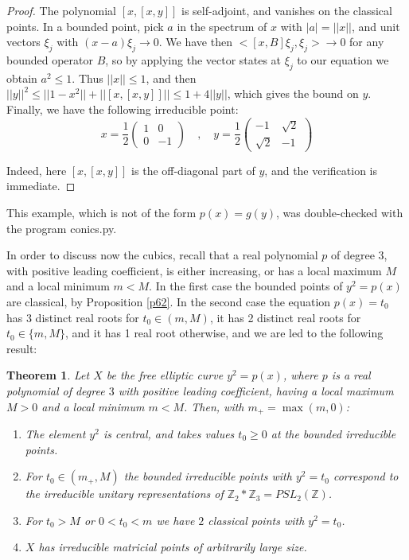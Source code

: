 \documentclass[11pt]{amsart}
\newtheorem{theorem}{Theorem}[section]
\theoremstyle{definition}
\begin{document}
\begin{proof}
The polynomial $[x,[x,y]]$ is self-adjoint, and vanishes on the classical points. In a bounded point, pick $a$ in the spectrum of $x$ with $|a|=||x||$, and unit vectors $\xi_j$ with $(x-a)\xi_j\to0$. We have then $<[x,B]\xi_j,\xi_j>\to0$ for any bounded operator $B$, so by applying the vector states at $\xi_j$ to our equation we obtain $a^2\leq1$. Thus $||x||\leq1$, and then $||y||^2\leq||1-x^2||+||[x,[x,y]]||\leq1+4||y||$, which gives the bound on $y$. Finally, we have the following irreducible point:
$$x=\frac{1}{2}\begin{pmatrix}1&0\\0&-1\end{pmatrix}\quad,\quad y=\frac{1}{2}\begin{pmatrix}-1&\sqrt2\\ \sqrt2&-1\end{pmatrix}$$

Indeed, here $[x,[x,y]]$ is the off-diagonal part of $y$, and the verification is immediate.
\end{proof}

This example, which is not of the form $p(x)=g(y)$, was double-checked with the program conics.py.

In order to discuss now the cubics, recall that a real polynomial $p$ of degree 3, with positive leading coefficient, is either increasing, or has a local maximum $M$ and a local minimum $m<M$. In the first case the bounded points of $y^2=p(x)$ are classical, by Proposition \ref{p62}. In the second case the equation $p(x)=t_0$ has 3 distinct real roots for $t_0\in(m,M)$, it has 2 distinct real roots for $t_0\in\{m,M\}$, and it has 1 real root otherwise, and we are led to the following result:

\begin{theorem}\label{t63}
Let $X$ be the free elliptic curve $y^2=p(x)$, where $p$ is a real polynomial of degree $3$ with positive leading coefficient, having a local maximum $M>0$ and a local minimum $m<M$. Then, with $m_+=\max(m,0)$:
\begin{enumerate}
\item The element $y^2$ is central, and takes values $t_0\geq0$ at the bounded irreducible points.

\item For $t_0\in(m_+,M)$ the bounded irreducible points with $y^2=t_0$ correspond to the irreducible unitary representations of $\mathbb Z_2*\mathbb Z_3=PSL_2(\mathbb Z)$.

\item For $t_0>M$ or $0<t_0<m$ we have $2$ classical points with $y^2=t_0$.

\item $X$ has irreducible matricial points of arbitrarily large size.
\end{enumerate}
\end{theorem}
\end{document}
